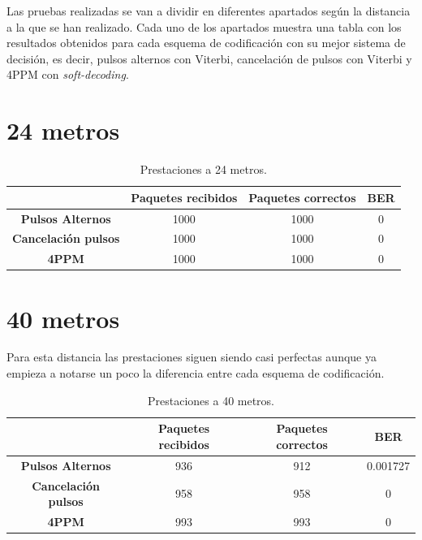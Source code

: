 Las pruebas realizadas se van a dividir en diferentes apartados según la distancia 
a la que se han realizado. Cada uno de los apartados muestra 
una tabla con los resultados obtenidos para cada esquema de codificación con su mejor
sistema de decisión, es decir, pulsos alternos con Viterbi,
cancelación de pulsos con Viterbi y 4PPM con \textit{soft-decoding}.

\section{24 metros}

\begin{table}[ht]
	\begin{tabular}{c|c|c|c|}
	\cline{2-4}
														 & \textbf{Paquetes recibidos} & \textbf{Paquetes correctos} & \textbf{BER} \\ \hline
	\multicolumn{1}{|c|}{\textbf{Pulsos Alternos}}       & 1000                        & 1000                        & 0            \\ \hline
	\multicolumn{1}{|c|}{\textbf{Cancelación pulsos}} 	 & 1000                        & 1000                        & 0            \\ \hline
	\multicolumn{1}{|c|}{\textbf{4PPM}}                  & 1000                        & 1000                        & 0            \\ \hline
	\end{tabular}
	\caption{\small{Prestaciones a 24 metros.}}
	\end{table}

\section{40 metros}

Para esta distancia las prestaciones siguen siendo casi perfectas aunque ya 
empieza a notarse un poco la diferencia entre cada esquema de codificación.

\begin{table}[ht]
	\begin{tabular}{c|c|c|c|}
	\cline{2-4}
																				 & \textbf{Paquetes recibidos} & \textbf{Paquetes correctos} & \textbf{BER} \\ \hline
	\multicolumn{1}{|c|}{\cellcolor[HTML]{FFFFFF}\textbf{Pulsos Alternos}}       & 936                         & 912                         & 0.001727     \\ \hline
	\multicolumn{1}{|c|}{\cellcolor[HTML]{FFFFFF}\textbf{Cancelación pulsos}} 	 & 958                         & 958                         & 0            \\ \hline
	\multicolumn{1}{|c|}{\cellcolor[HTML]{FFFFFF}\textbf{4PPM}}                  & 993                         & 993                         & 0            \\ \hline
	\end{tabular}
	\caption{\small{Prestaciones a 40 metros.}}
	\end{table}

